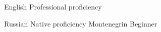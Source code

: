 
\begin{cvskills}

  \cvskill
    {English} %
    {Professional proficiency} %

  \cvskill
    {Russian} %
    {Native proficiency} %
  \cvskill
    {Montenegrin} %
    {Beginner} %

\end{cvskills}
